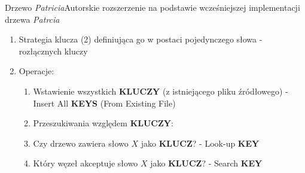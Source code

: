 \documentclass[aspectratio=1610,english]{beamer} %
\begin{document}
	\begin{frame}{Drzewo \emph{Patricia}}{Autorskie rozszerzenie na podstawie wcześniejszej implementacji}
	     drzewa \emph{Patrcia} 
        \begin{enumerate}
            \addtolength{\itemindent}{-0.6cm}
            \item {\color{AGH@green}Strategia klucza (2)} definiująca go w postaci pojedynczego słowa - rozłącznych kluczy
            \item {\color{AGH@green}Operacje:} 
            \begin{enumerate}
                \addtolength{\itemindent}{-0.6cm}
                \item {\color{AGH@green} Wstawienie wszystkich \textbf{KLUCZY}} {\color{gray} (z istniejącego pliku źródłowego)} \newline 
                    {\scriptsize \color{gray} \hspace*{0.4cm} - Insert All \textbf{KEYS} \color{lightgray} (From Existing File)}
                
                \item Przeszukiwania względem \textbf{KLUCZY}:
                
                    \setcounter{enumii}{0}
                    \addtolength{\itemindent}{0.7cm}
                    \item {\color{AGH@green} Czy drzewo zawiera słowo $X$ jako \textbf{KLUCZ}?} \newline 
                        {\scriptsize \color{gray} \hspace*{0.4cm} - Look-up \textbf{KEY}}
                    \item {\color{AGH@green} Który węzeł akceptuje słowo $X$ jako \textbf{KLUCZ}?} \newline 
                        {\scriptsize \color{gray} \hspace*{0.4cm} - Search \textbf{KEY}} \newline
            \end{enumerate}
        \end{enumerate}
        

\end{frame}
\end{document}
